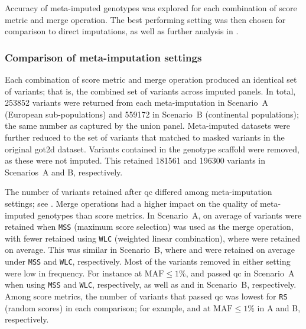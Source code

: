 Accuracy of meta-imputed genotypes was explored for each combination of score metric and merge operation.
The best performing setting was then chosen for comparison to direct imputations, as well as further analysis in .

\subsubsection{Comparison of meta-imputation settings}

Each combination of score metric and merge operation produced an identical set of variants; that is, the combined set of variants across imputed panels.
In total, \num{253852} variants were returned from each meta-imputation in Scenario~A (European sub-populations) and \num{559172} in Scenario~B (continental populations); \ie the same number as captured by the union panel.
Meta-imputed datasets were further reduced to the set of variants that matched to masked variants in the original \gls{got2d} dataset.
Variants contained in the genotype scaffold were removed, as these were not imputed.
This retained \num{181561} and \num{196300} variants in Scenarios~A and B, respectively.



%

%

The number of variants retained after \gls{qc} differed among meta-imputation settings; see .
Merge operations had a higher impact on the quality of meta-imputed genotypes than score metrics.
In Scenario~A, on average  of variants were retained when \texttt{MSS} (maximum score selection) was used as the merge operation, with fewer retained using \texttt{WLC} (weighted linear combination), where  were retained on average.
This was similar in Scenario~B, where  and 
were retained on average under \texttt{MSS} and \texttt{WLC}, respectively.
Most of the variants removed in either setting were low in frequency.
For instance at ${\text{MAF} \leq 1\%}$,
 and
 passed \gls{qc} in Scenario~A
when using \texttt{MSS} and \texttt{WLC}, respectively, as well as
 and
 in Scenario~B, respectively.
Among score metrics, the number of variants that passed \gls{qc} was lowest for \texttt{RS} (random scores) in each comparison; for example,  and  at ${\text{MAF} \leq 1\%}$ in A and B, respectively.

